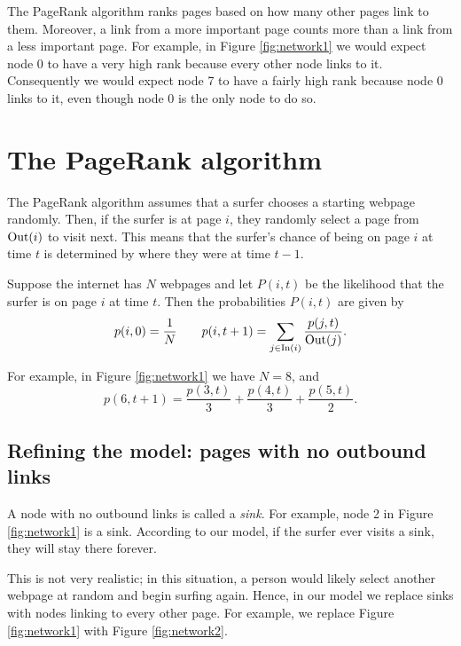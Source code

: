The PageRank algorithm ranks pages based on how many other pages link to them.
Moreover, a link from a more important page counts more than a link from a less important page.
For example, in Figure \ref{fig:network1} we would expect node 0 to have a very high rank because every other node links to it. 
Consequently we would expect node 7 to have a fairly high rank because node 0 links to it, even though node 0 is the only node to do so.

\section*{The PageRank algorithm}
The PageRank algorithm assumes that a surfer chooses a starting webpage randomly.
Then, if the surfer is at page $i$, they randomly select a page from $\operatorname{Out}(i)$ to visit next.
This means that the surfer's chance of being on page $i$ at time $t$ is determined by where they were at time $t-1$.

Suppose the internet has $N$ webpages and let $P(i,t)$ be the likelihood that the surfer is on page $i$ at time $t$.
Then the probabilities $P(i,t)$ are given by
\begin{equation}\label{equ:pr1}
p(i,0)=\frac{1}{N} \qquad p(i,t+1) = \sum_{j \in \operatorname{In}(i)} \frac{p(j,t)}{\operatorname{Out}(j)}.
\end{equation}

For example, in Figure \ref{fig:network1} we have $N=8$, and 
\[
p(6, t+1)=\frac{p(3,t)}{3}+\frac{p(4,t)}{3} + \frac{p(5,t)}{2}.
\]

\subsection*{Refining the model: pages with no outbound links}
A node with no outbound links is called a \emph{sink}. 
For example, node 2 in Figure \ref{fig:network1} is a sink.
According to our model, if the surfer ever visits a sink, they will stay there forever.

This is not very realistic; in this situation, a person would likely select another webpage at random and begin surfing again.
Hence, in our model we replace sinks with nodes linking to every other page. 
For example, we replace Figure \ref{fig:network1} with Figure \ref{fig:network2}.

